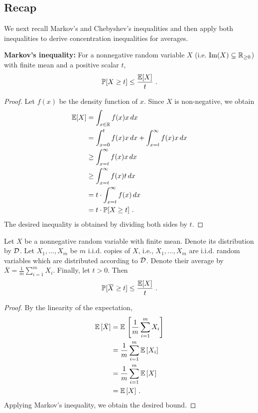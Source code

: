 \subsection{Recap} \label{sec:recap}
We next recall Markov's and Chebyshev's inequalities and then apply both inequalities to derive concentration inequalities for averages.
\begin{theorem} \textbf{Markov's inequality:} For a nonnegative random
variable $X$ (i.e. $\text{Im}(X) \subseteq \mathbb{R}_{\ge 0}$) with finite mean and a positive scalar $t$,
\[
\operatorname*{\mathbb{P}} [X \geq t] \leq \frac{\mathbb{E}[X]}{t}~.
\]
\end{theorem}
\begin{proof}
Let $f(x)$ be the density function of $x$. Since $X$ is non-negative, we obtain
\begin{align*}
\mathbb{E}[X] &= \int_{x \in \mathbb{R}} f(x) x \,dx \\&
= \int_{x = 0} ^t f(x) x\, dx + \int_{x =t} ^\infty f(x) x \, dx \\&
\ge \int_{x =t} ^\infty f(x) x \,dx \\&
\ge \int_{x =t} ^\infty f(x) t \, dx\\&
= t \cdot \int_{x =t} ^\infty f(x) \,dx \\&
=t \cdot \operatorname*{\mathbb{P}}[X \ge t] ~.
\end{align*}
The desired inequality is obtained by dividing both sides by $t$.
\end{proof}
\begin{corollary} \label{cor:markovAve}
Let $X$ be a nonnegative random variable with finite mean. Denote its distribution by $\mathcal{D}$. Let $X_1,\ldots,X_m$ be $m$ i.i.d. copies of $X$, i.e., $X_1,\ldots,X_m$ are i.i.d. random variables which are distributed according to $\mathcal{D}$. Denote their average by $\overbar{X}=\frac{1}{m} \sum_{i=1} ^m X_i$. Finally, let $t>0$. Then
\[
\prob [\overbar{X} \geq t] \leq \frac{\mathbb{E}[X]}{t}~.
\]
\end{corollary}
\begin{proof}
By the linearity of the expectation,
\begin{align*}
\mathbb{E}\, [\bar{X}] &= \mathbb{E}\, \left[\frac{1}{m} \sum_{i=1} ^m X_i \right] \\&
= \frac{1}{m} \sum_{i=1} ^m \mathbb{E}\,[X_i] \\&
= \frac{1}{m} \sum_{i=1} ^m \mathbb{E}\,[X] \\&
= \mathbb{E}\,[X]~.
\end{align*}
Applying Markov's inequality, we obtain the desired bound.
\end{proof}

